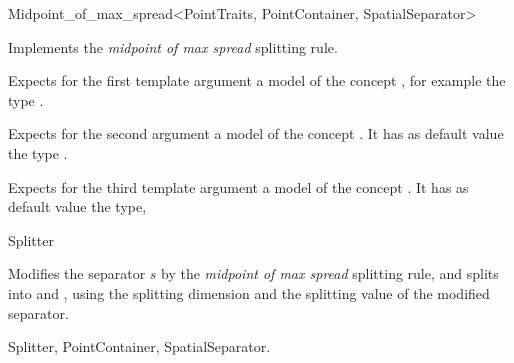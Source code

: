 

\begin{ccRefFunctionObjectClass}{Midpoint_of_max_spread<PointTraits, PointContainer, SpatialSeparator>}


\ccDefinition
Implements the {\em midpoint of max spread} splitting rule.

\ccParameters

Expects for the first template argument a model of
the concept , for example
the type . 

Expects for the second argument a model of the concept . It has as default value
the type .

Expects for the third template argument a model of the concept . It has as default value
the type, 


\ccIsModel

Splitter

\ccTypes



\ccOperations

{Modifies the separator $s$ by the {\em midpoint of max spread} splitting rule, 
and splits  into  and ,
using the splitting dimension and the splitting value of the modified separator.
}

\ccSeeAlso

Splitter, PointContainer, SpatialSeparator.

\end{ccRefFunctionObjectClass}


